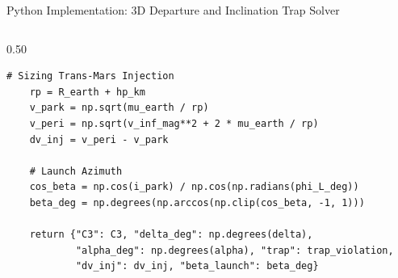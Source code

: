 \documentclass[aspectratio=169, 10pt]{beamer}
\begin{document}
\begin{frame}[fragile]{Python Implementation: 3D Departure and Inclination Trap Solver}
\begin{columns}[t]
\begin{column}{0.50\textwidth}
\begin{lstlisting}[style=pythoncode]
    # Sizing Trans-Mars Injection
    rp = R_earth + hp_km
    v_park = np.sqrt(mu_earth / rp)
    v_peri = np.sqrt(v_inf_mag**2 + 2 * mu_earth / rp)
    dv_inj = v_peri - v_park
    
    # Launch Azimuth
    cos_beta = np.cos(i_park) / np.cos(np.radians(phi_L_deg))
    beta_deg = np.degrees(np.arccos(np.clip(cos_beta, -1, 1)))
    
    return {"C3": C3, "delta_deg": np.degrees(delta), 
            "alpha_deg": np.degrees(alpha), "trap": trap_violation,
            "dv_inj": dv_inj, "beta_launch": beta_deg}
\end{lstlisting}
        \end{column}
    \end{columns}
\end{frame}

\end{document}

